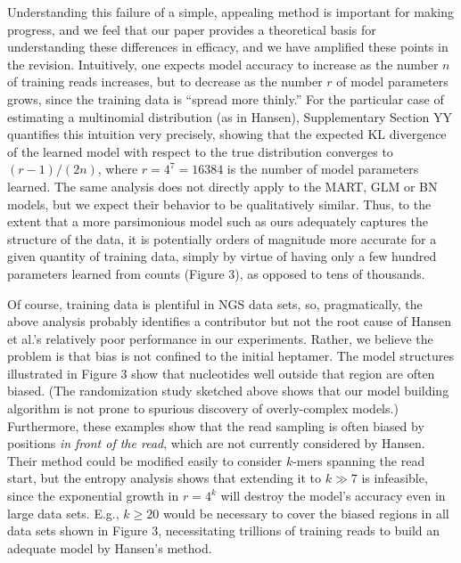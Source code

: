 \documentclass{article}
\begin{document}
Understanding this failure of a simple, appealing method is important
for making progress, and we feel that our paper provides a theoretical
basis for understanding these differences in efficacy, and we have
amplified these points in the revision.  Intuitively, one expects
model accuracy to increase as the number $n$ of training reads
increases, but to decrease as the number $r$ of model parameters
grows, since the training data is ``spread more thinly.''  For the
particular case of estimating a multinomial distribution (as in
Hansen), Supplementary Section YY quantifies this intuition very
precisely, showing that the expected KL divergence of the learned
model with respect to the true distribution converges to $(r-1)/(2n)$,
where $r=4^7=16384$ is the number of model parameters learned.  The
same analysis does not directly apply to the MART, GLM or BN models,
but we expect their behavior to be qualitatively similar.  Thus, to
the extent that a more parsimonious model such as ours adequately
captures the structure of the data, it is potentially orders of
magnitude more accurate for a given quantity of training data, simply
by virtue of having only a few hundred parameters learned from counts
(Figure 3), as opposed to tens of thousands.  


Of course, training data is plentiful in NGS data sets, so,
pragmatically, the above analysis probably identifies a contributor
but not the root cause of Hansen et al.'s relatively poor performance
in our experiments.  Rather, we believe the problem is that bias is
not confined to the initial heptamer.  The model structures
illustrated in Figure 3 show that nucleotides well outside that region
are often biased.  (The randomization study sketched above shows that
our model building algorithm is not prone to spurious discovery of
overly-complex models.)  Furthermore, these examples show that the
read sampling is often biased by positions \emph{in front of the
  read}, which are not currently considered by Hansen.  Their method
could be modified easily to consider $k$-mers spanning the read start,
but the entropy analysis shows that extending it to $k \gg 7$ is
infeasible, since the exponential growth in $r=4^k$ will destroy the
model's accuracy even in large data sets.  E.g., $k \ge 20$ would be
necessary to cover the biased regions in all data sets shown in Figure
3, necessitating trillions of training reads to build an adequate
model by Hansen's method.
\end{document}

